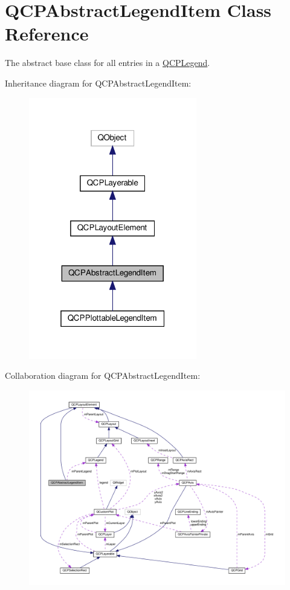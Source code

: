\hypertarget{classQCPAbstractLegendItem}{}\section{Q\+C\+P\+Abstract\+Legend\+Item Class Reference}
\label{classQCPAbstractLegendItem}


The abstract base class for all entries in a \hyperlink{classQCPLegend}{Q\+C\+P\+Legend}.  




Inheritance diagram for Q\+C\+P\+Abstract\+Legend\+Item\+:\nopagebreak
\begin{figure}[H]
\begin{center}
\leavevmode
\includegraphics[width=208pt]{classQCPAbstractLegendItem__inherit__graph}
\end{center}
\end{figure}


Collaboration diagram for Q\+C\+P\+Abstract\+Legend\+Item\+:\nopagebreak
\begin{figure}[H]
\begin{center}
\leavevmode
\includegraphics[width=350pt]{classQCPAbstractLegendItem__coll__graph}
\end{center}
\end{figure}

